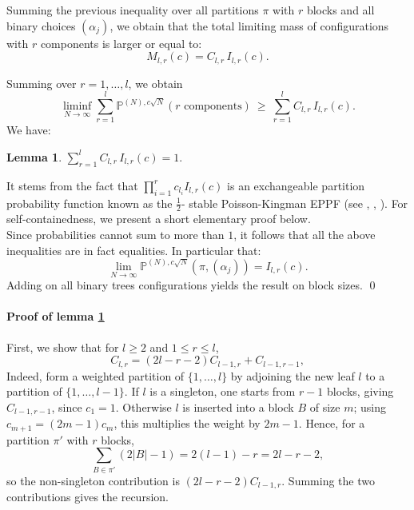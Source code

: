 \documentclass[11pt]{article}
\newtheorem{lemma}{Lemma}[section]
\begin{document}
\medskip
\noindent

Summing the previous inequality over all
partitions $\pi$ with $r$ blocks and all binary choices $(\alpha_j)$,
we obtain that the total limiting mass of configurations with $r$
components is larger or equal to:
\[
M_{l,r}(c)
=
C_{l,r}\, I_{l,r}(c).
\]

Summing over $r=1,\dots,l$,
we obtain
\[
\liminf_{N\to\infty}
\sum_{r=1}^l
\mathbb P^{(N),c\sqrt N}
(\text{$r$ components})
\ \ge\
\sum_{r=1}^l C_{l,r}\,I_{l,r}(c).
\]
We have:
\begin{lemma}\label{zoz}
 $\sum_{r=1}^l C_{l,r}\,I_{l,r}(c)=1.$
\end{lemma}
It stems from the fact that $\prod_{i=1}^rc_{l_i }I_{l,r}(c)$ is an exchangeable partition probability function known as the $\frac 1 2$- stable Poisson-Kingman EPPF (see \cite{Pitman2003PK}, \cite{Pitman2006}, \cite{GnedinPitman2006}). For self-containedness, we present a short elementary proof below.\\
Since probabilities cannot sum to more than $1$,
it follows that all the above inequalities are in fact equalities.
In particular that:
\[
\lim_{N\to\infty}
\mathbb P^{(N),c\sqrt N}
(\pi,(\alpha_j))
=I_{l,r}(c).
\]
Adding on all binary trees configurations yields the result on block sizes.
\qed





\paragraph{Proof of lemma \ref{zoz}}
First, we show that for \(l\ge 2\) and \(1\le r\le l\),
\begin{equation}\label{eq:C-recursion}
C_{l,r}=(2l-r-2)C_{l-1,r}+C_{l-1,r-1},
\end{equation}
Indeed, form a weighted partition of \(\{1,\dots,l\}\) by adjoining the new
leaf \(l\) to a partition of \(\{1,\dots,l-1\}\). If \(l\) is a singleton,
one starts from \(r-1\) blocks, giving \(C_{l-1,r-1}\), since \(c_1=1\).
Otherwise \(l\) is inserted into a block \(B\) of size \(m\); using
\(c_{m+1}=(2m-1)c_m\), this multiplies the weight by \(2m-1\). Hence, for
a partition \(\pi'\) with \(r\) blocks,
\[
\sum_{B\in\pi'}(2|B|-1)=2(l-1)-r=2l-r-2, \]
so the non-singleton contribution is \((2l-r-2)C_{l-1,r}\). Summing the two
contributions gives the recursion.
\end{document}
